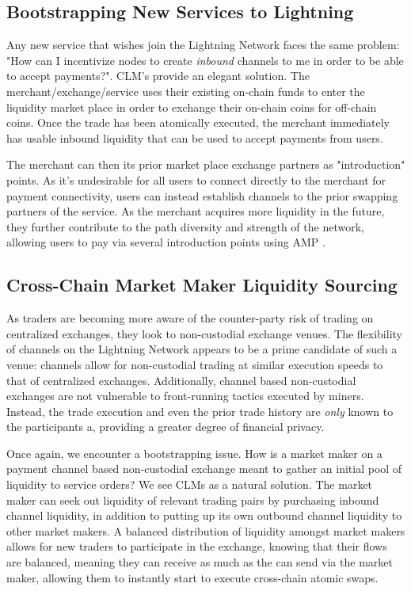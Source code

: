 \documentclass[12pt,a4paper]{article}
\theoremstyle{definition}
\begin{document}
\subsection{Bootstrapping New Services to Lightning} 

Any new service that wishes join the Lightning Network faces the same problem:
"How can I incentivize nodes to create \emph{inbound} channels to me in order
to be able to accept payments?". CLM's provide an elegant solution. The
merchant/exchange/service uses their existing on-chain funds to enter the
liquidity market place in order to exchange their on-chain coins for off-chain
coins. Once the trade has been atomically executed, the merchant immediately
has usable inbound liquidity that can be used to accept payments from users. 

The merchant can then its prior market place exchange partners as
"introduction" points. As it's undesirable for all users to connect directly to
the merchant for payment connectivity, users can instead establish channels to
the prior swapping partners of the service. As the merchant acquires more
liquidity in the future, they further contribute to the path diversity and
strength of the network, allowing users to pay via several introduction points
using AMP \cite{amp}. 

\subsection{Cross-Chain Market Maker Liquidity Sourcing} 

As traders are becoming more aware of the counter-party risk of trading on
centralized exchanges, they look to non-custodial exchange venues. The
flexibility of channels on the Lightning Network appears to be a prime
candidate of such a venue: channels allow for non-custodial trading at similar
execution speeds to that of centralized exchanges. Additionally, channel based
non-custodial exchanges are not vulnerable to front-running tactics executed by
miners. Instead, the trade execution and even the prior trade history are
\emph{only} known to the participants a, providing a greater degree of
financial privacy. 

Once again, we encounter a bootstrapping issue. How is a market maker on a
payment channel based non-custodial exchange meant to gather an initial pool of
liquidity to service orders? We see CLMs as a natural solution. The market
maker can seek out liquidity of relevant trading pairs by purchasing inbound
channel liquidity, in addition to putting up its own outbound channel liquidity
to other market makers. A balanced distribution of liquidity amongst market
makers allows for new traders to participate in the exchange, knowing that
their flows are balanced, meaning they can receive as much as the can send via
the market maker, allowing them to instantly start to execute cross-chain
atomic swaps. 
\end{document}
